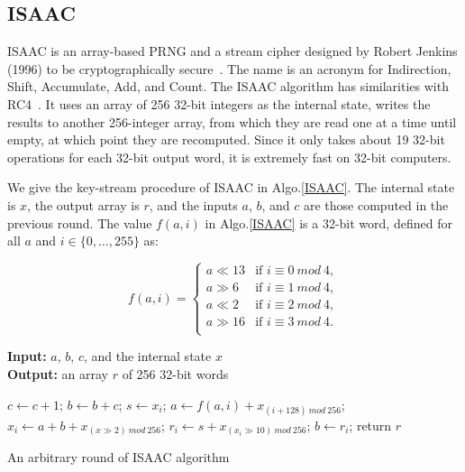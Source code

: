 \subsection{ISAAC}
ISAAC is an array-based PRNG and a stream cipher designed by Robert Jenkins (1996) to be cryptographically secure~\cite{Jenkins1996}. The name is an acronym for Indirection, Shift, Accumulate, Add, and Count. The ISAAC algorithm has similarities with RC4~\cite{citeulike:3805944}. It uses an array of 256 32-bit integers as the internal state, writes the results to another 256-integer array, from which they are read one at a time until empty, at which point they are recomputed. Since it only takes about 19 32-bit operations for each 32-bit output word, it is extremely fast on 32-bit computers.

We give the key-stream procedure of ISAAC in Algo.\ref{ISAAC}. The internal state is $x$, the output array is $r$, and the inputs $a$, $b$, and $c$ are those computed in the previous round. %
The value $f(a,i)$ in Algo.\ref{ISAAC} is a 32-bit word, defined for all $a$ and $i\in\{0,\dots,255\}$ as:

\begin{equation}
f(a,i) = \left\{\begin{array}{ll}
a\ll13 & \text{if } i\equiv0~mod~4 , \\
a\gg6 & \text{if } i\equiv1~mod~4 , \\
a\ll2 & \text{if } i\equiv2~mod~4 , \\
a\gg16 & \text{if } i\equiv3~mod~4 . \\
\end{array}
\right.
\end{equation}

\begin{algorithm}
\textbf{Input:} $a$, $b$, $c$, and the internal state $x$\\
\textbf{Output:} an array $r$ of 256 32-bit words
\begin{algorithmic}[1]
\STATE$c\leftarrow{c+1}$;
\STATE$b\leftarrow{b+c}$;
\STATE$s\leftarrow{x_i}$;
\STATE$a\leftarrow{f(a,i)+x_{(i+128)~mod~256}}$;
\STATE$x_i\leftarrow{a+b+x_{(x\gg2)~mod~256}}$;
\STATE$r_i\leftarrow{s+x_{(x_i\gg10)~mod~256}}$;
\STATE$b\leftarrow{r_i}$;
\ENDWHILE
\STATE return $r$\;
\medskip
\caption{An arbitrary round of ISAAC algorithm}
\label{ISAAC}
\end{algorithmic}
\end{algorithm}





